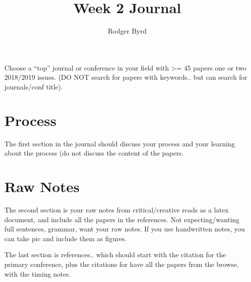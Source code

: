\documentclass[conference]{IEEEtran}
\begin{document}

\title{Week 2 Journal}
\author{Rodger Byrd}
\maketitle

Choose a “top” journal or conference in your field with >= 45 papers one or two 2018/2019 issues.   (DO NOT search for papers with keywords.. but can search for journals/conf title).

\section{Process}
The first section in the journal should discuss your process and your learning about the process (do not discuss the content of the papers. 

\section{Raw Notes}
The second section is your raw notes from critical/creative reads as a latex document, and include all the papers in the references. Not expecting/wanting full sentences, grammar, want your raw notes.  If you use handwritten notes, you can take pic and include them as figures. 


The last section is references.. which should start with the citation for the primary conference, plus the citations for have all the papers from the browse, with the timing notes. 


 \cite{1} \cite{2} \cite{4} \cite{5} \cite{6}  \cite{8} \cite{9} \cite{10} \cite{11} \cite{12} \cite{13} \cite{14} \cite{15} \cite{16} \cite{17} \cite{19} \cite{20} \cite{21} \cite{22} \cite{23} \cite{24}





\end{document}
